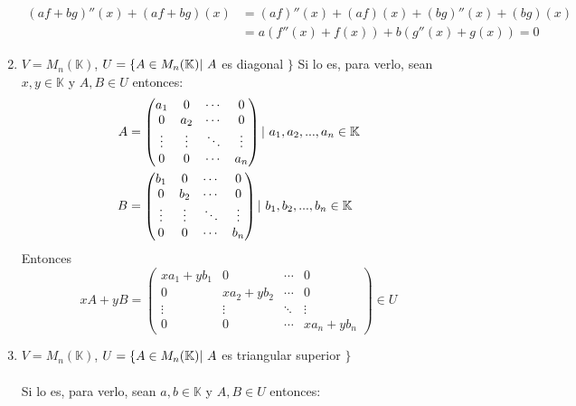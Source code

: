 \begin{ejercicio}
\begin{enumerate}
		      \begin{align*}
			      (af + bg)''(x) + (af + bg)(x) & = (af)''(x) + (af)(x) + (bg)''(x) + (bg)(x) \\&= a(f''(x) + f(x)) + b(g''(x) + g(x)) = 0
		      \end{align*}
		\item $V = M_n(\mathbb{K})$, $U = \{ A \in M_n(\mathbb{K}) \arrowvert \ A $ es diagonal $\}$
		      Si lo es, para verlo, sean $x,y \in \mathbb{K}$ y $A,B \in U$ entonces:
		      \begin{align*}
			      A &= \begin{pmatrix}
				      a_1    & 0      & \cdots & 0      \\
				      0      & a_2    & \cdots & 0      \\
				      \vdots & \vdots & \ddots & \vdots \\
				      0      & 0      & \cdots & a_n
			      \end{pmatrix} \arrowvert \ a_1,a_2,...,a_n \in \mathbb{K}
			      \\ B &=\begin{pmatrix}
				      b_1    & 0      & \cdots & 0      \\
				      0      & b_2    & \cdots & 0      \\
				      \vdots & \vdots & \ddots & \vdots \\
				      0      & 0      & \cdots & b_n
			      \end{pmatrix} \arrowvert \ b_1,b_2,...,b_n \in \mathbb{K}
		      \end{align*}
		      Entonces
		      \begin{equation*}
			      xA + yB = \begin{pmatrix}
				      xa_1 + yb_1 & 0           & \cdots & 0           \\
				      0           & xa_2 + yb_2 & \cdots & 0           \\
				      \vdots      & \vdots      & \ddots & \vdots      \\
				      0           & 0           & \cdots & xa_n + yb_n
			      \end{pmatrix} \in U
		      \end{equation*}
		\item $V = M_n(\mathbb{K})$, $U = \{ A \in M_n(\mathbb{K}) \arrowvert \ A $ es triangular superior $\}$
		      \\ \\ Si lo es, para verlo, sean $a,b \in \mathbb{K}$ y $A,B \in U$ entonces:

\end{enumerate}
\end{ejercicio}
